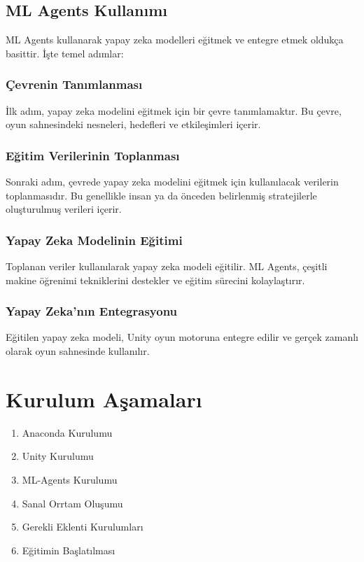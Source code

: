 \documentclass{article}
\begin{document}
\subsection{ML Agents Kullanımı}
ML Agents kullanarak yapay zeka modelleri eğitmek ve entegre etmek oldukça basittir. İşte temel adımlar:

\subsubsection{Çevrenin Tanımlanması}
İlk adım, yapay zeka modelini eğitmek için bir çevre tanımlamaktır. Bu çevre, oyun sahnesindeki nesneleri, hedefleri ve etkileşimleri içerir.

\subsubsection{Eğitim Verilerinin Toplanması}
Sonraki adım, çevrede yapay zeka modelini eğitmek için kullanılacak verilerin toplanmasıdır. Bu genellikle insan ya da önceden belirlenmiş stratejilerle oluşturulmuş verileri içerir.

\subsubsection{Yapay Zeka Modelinin Eğitimi}
Toplanan veriler kullanılarak yapay zeka modeli eğitilir. ML Agents, çeşitli makine öğrenimi tekniklerini destekler ve eğitim sürecini kolaylaştırır.

\subsubsection{Yapay Zeka'nın Entegrasyonu}
Eğitilen yapay zeka modeli, Unity oyun motoruna entegre edilir ve gerçek zamanlı olarak oyun sahnesinde kullanılır.
\clearpage
\section{Kurulum Aşamaları}
\begin{enumerate}
    \item Anaconda Kurulumu
    \item Unity Kurulumu
    \item ML-Agents Kurulumu
    \item Sanal Orrtam Oluşumu
    \item Gerekli Eklenti Kurulumları
    \item Eğitimin Başlatılması
\end{enumerate}
\end{document}
